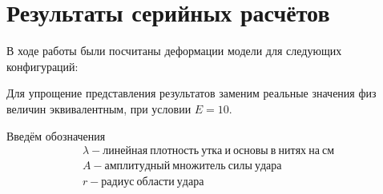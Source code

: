\section{Результаты серийных расчётов}\label{ch:results}
В ходе работы были посчитаны деформации модели для следующих конфигураций:

Для упрощение представления результатов заменим реальные значения физ величин эквивалентным, при условии $E=10$.

Введём обозначения
\begin{gather*}
    \lambda - линейная~плотность~утка~и~основы~в~нитях~на~см \\
    A - амплитудный~множитель~силы~удара \\
    r - радиус~области~удара
\end{gather*}

